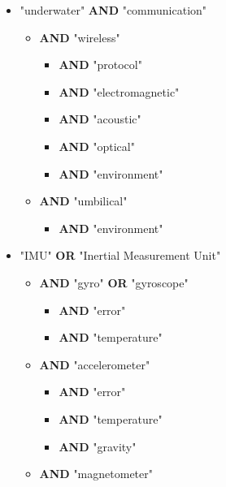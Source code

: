 \begin{itemize}
\begin{itemize}
	\end{itemize}
	\item "underwater" {\sffamily\bfseries\textcolor{RoyalRed}{AND}} "communication"
	\begin{itemize}
		\item {\sffamily\bfseries\textcolor{RoyalRed}{AND}} "wireless"
		\begin{itemize}
			\item {\sffamily\bfseries\textcolor{RoyalRed}{AND}} "protocol"
			\item {\sffamily\bfseries\textcolor{RoyalRed}{AND}} "electromagnetic"
			\item {\sffamily\bfseries\textcolor{RoyalRed}{AND}} "acoustic"
			\item {\sffamily\bfseries\textcolor{RoyalRed}{AND}} "optical"
			\item {\sffamily\bfseries\textcolor{RoyalRed}{AND}} "environment"
		\end{itemize}
		\item {\sffamily\bfseries\textcolor{RoyalRed}{AND}} "umbilical"
		\begin{itemize}
			\item {\sffamily\bfseries\textcolor{RoyalRed}{AND}} "environment"
		\end{itemize}
	\end{itemize}
	\item "IMU" {\sffamily\bfseries\textcolor{RoyalRed}{OR}} "Inertial Measurement Unit"
	\begin{itemize}
		\item {\sffamily\bfseries\textcolor{RoyalRed}{AND}} "gyro" {\sffamily\bfseries\textcolor{RoyalRed}{OR}} "gyroscope"
		\begin{itemize}
			\item {\sffamily\bfseries\textcolor{RoyalRed}{AND}} "error"
			\item {\sffamily\bfseries\textcolor{RoyalRed}{AND}} "temperature"
		\end{itemize}
		\item {\sffamily\bfseries\textcolor{RoyalRed}{AND}} "accelerometer"
		\begin{itemize}
			\item {\sffamily\bfseries\textcolor{RoyalRed}{AND}} "error"
			\item {\sffamily\bfseries\textcolor{RoyalRed}{AND}} "temperature"
			\item {\sffamily\bfseries\textcolor{RoyalRed}{AND}} "gravity"
		\end{itemize}
		\item {\sffamily\bfseries\textcolor{RoyalRed}{AND}} "magnetometer"

\end{itemize}
\end{itemize}
